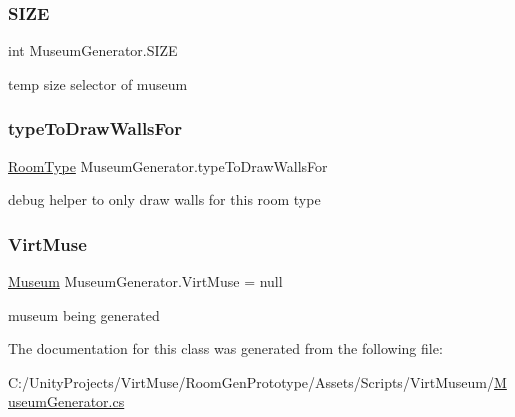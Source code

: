 \subsubsection{\texorpdfstring{S\+I\+ZE}{SIZE}}
{\footnotesize\ttfamily int Museum\+Generator.\+S\+I\+ZE}



temp size selector of museum 

\mbox{\label{class_museum_generator_afba388daa5228b0542ebdf7799521ca9}} 
\subsubsection{\texorpdfstring{type\+To\+Draw\+Walls\+For}{typeToDrawWallsFor}}
{\footnotesize\ttfamily \mbox{\hyperlink{_room_8cs_ab540f7414f306325d92272bcef1e34e1}{Room\+Type}} Museum\+Generator.\+type\+To\+Draw\+Walls\+For}



debug helper to only draw walls for this room type 

\mbox{\label{class_museum_generator_abd9c3bf24730c6ad36b0ae78838ffaa8}} 
\subsubsection{\texorpdfstring{Virt\+Muse}{VirtMuse}}
{\footnotesize\ttfamily \mbox{\hyperlink{class_museum}{Museum}} Museum\+Generator.\+Virt\+Muse = null}



museum being generated 



The documentation for this class was generated from the following file\+:\begin{DoxyCompactItemize}
\item 
C\+:/\+Unity\+Projects/\+Virt\+Muse/\+Room\+Gen\+Prototype/\+Assets/\+Scripts/\+Virt\+Museum/\mbox{\hyperlink{_museum_generator_8cs}{Museum\+Generator.\+cs}}\end{DoxyCompactItemize}
